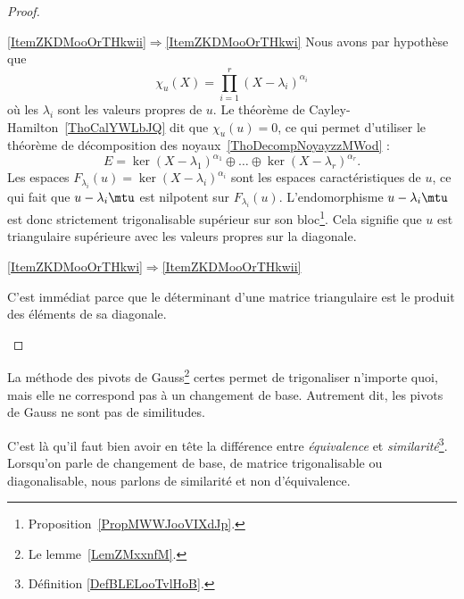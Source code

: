 \begin{proof}
    \begin{subproof}
        \item[\ref{ItemZKDMooOrTHkwii}\( \Rightarrow\)\ref{ItemZKDMooOrTHkwi}]
            Nous avons par hypothèse que
            \begin{equation}
                \chi_u(X)=\prod_{i=1}^r(X-\lambda_i)^{\alpha_i}
            \end{equation}
            où les \( \lambda_i\) sont les valeurs propres de \( u\). Le théorème de Cayley-Hamilton~\ref{ThoCalYWLbJQ} dit que \( \chi_u(u)=0\), ce qui permet d'utiliser le théorème de décomposition des noyaux~\ref{ThoDecompNoyayzzMWod} :
            \begin{equation}
                E=\ker(X-\lambda_1)^{\alpha_1}\oplus\ldots\oplus\ker(X-\lambda_r)^{\alpha_r}.
            \end{equation}
            Les espaces \( F_{\lambda_i}(u)=\ker(X-\lambda_i)^{\alpha_i}\) sont les espaces caractéristiques de \( u\), ce qui fait que \( u-\lambda_i\mtu\) est nilpotent sur \( F_{\lambda_i}(u)\). L'endomorphisme \( u-\lambda_i\mtu\) est donc strictement trigonalisable supérieur sur son bloc\footnote{Proposition~\ref{PropMWWJooVIXdJp}.}. Cela signifie que \( u\) est triangulaire supérieure avec les valeurs propres sur la diagonale.

        \item[\ref{ItemZKDMooOrTHkwi}\( \Rightarrow\)\ref{ItemZKDMooOrTHkwii}]

            C'est immédiat parce que le déterminant d'une matrice triangulaire est le produit des éléments de sa diagonale.
    \end{subproof}
\end{proof}

\begin{remark}
    La méthode des pivots de Gauss\footnote{Le lemme~\ref{LemZMxxnfM}.} certes permet de trigonaliser n'importe quoi, mais elle ne correspond pas à un changement de base. Autrement dit, les pivots de Gauss ne sont pas de similitudes.

    C'est là qu'il faut bien avoir en tête la différence entre \emph{équivalence} et \emph{similarité}\footnote{Définition \ref{DefBLELooTvlHoB}.}. Lorsqu'on parle de changement de base, de matrice trigonalisable ou diagonalisable, nous parlons de similarité et non d'équivalence.
\end{remark}

